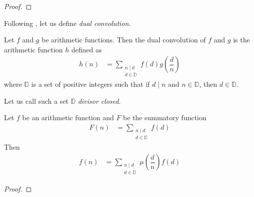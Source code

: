 \documentclass[elemannt.tex]{subfile}
\begin{document}
		\begin{proof}
			
		\end{proof}
	Following \textcite[Page $4$, Theorem $1.2.3$]{cojocaru_murty_2006}, let us define \textit{dual convolution}.
		\begin{definition}
			Let $f$ and $g$ be arithmetic functions. Then the dual convolution of $f$ and $g$ is the arithmetic function $h$ defined as
				\begin{align*}
					h(n)
						& = \sum_{\substack{n\mid d\\d\in\mathbb{D}}}f(d)g\left(\dfrac{d}{n}\right)
				\end{align*}
			where $\mathbb{D}$ is a set of positive integers such that if $d\mid n$ and $n\in\mathbb{D}$, then $d\in\mathbb{D}$.
		\end{definition}
	Let us call such a set $\mathbb{D}$ \textit{divisor closed}.
		\begin{theorem}
			Let $f$ be an arithmetic function and $F$ be the summatory function
				\begin{align*}
					F(n)
						& = \sum_{\substack{n\mid d\\d\in\mathbb{D}}}f(d)
				\end{align*}
			Then
				\begin{align*}
					f(n)
						& = \sum_{\substack{n\mid d\\d\in\mathbb{D}}}\mu\left(\dfrac{d}{n}\right)f(d)
				\end{align*}
		\end{theorem}
	
		\begin{proof}
			
		\end{proof}
\end{document}
